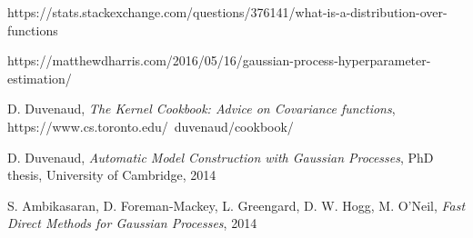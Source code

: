 \documentclass[10pt,twocolumn]{article}
\begin{document}
 https://stats.stackexchange.com/questions/376141/what-is-a-distribution-over-functions

\bibitem{} https://matthewdharris.com/2016/05/16/gaussian-process-hyperparameter-estimation/

 D. Duvenaud, \textit{The Kernel Cookbook: Advice on Covariance functions}, https://www.cs.toronto.edu/~duvenaud/cookbook/


 D. Duvenaud, \textit{Automatic Model Construction with Gaussian Processes}, PhD thesis,  University of Cambridge, 2014

 S. Ambikasaran, D. Foreman-Mackey, L. Greengard, D. W. Hogg, M. O'Neil, \textit{Fast Direct Methods for Gaussian Processes}, 2014
\end{document}
